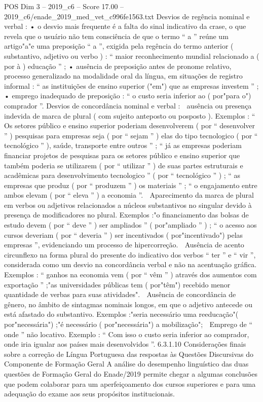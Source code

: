 \begin{textsample}{POS Dim 3 – 2019\_c6 – Score 17.00 – 2019\_c6/enade\_2019\_med\_vet\_c996fe1563.txt}
Desvios de regência nominal e verbal : • o desvio mais frequente é a falta do sinal indicativo da crase, o que revela que o usuário não tem consciência de que o termo “ a ” reúne um artigo"a"e uma preposição “ a ”, exigida pela regência do termo anterior ( substantivo, adjetivo ou verbo ) : “ maior reconhecimento mundial relacionado a ( por à ) educação ” ; • ausência de preposição antes de pronome relativo, processo generalizado na modalidade oral da língua, em situações de registro informal : “ as instituições de ensino superior ("em") que as empresas investem ” ; • emprego inadequado de preposição : “ o custo seria inferior ao ( por"para o") comprador ”.
Desvios de concordância nominal e verbal :  ausência ou presença indevida de marca de plural ( com sujeito anteposto ou posposto ).
Exemplos : “ Os setores público e ensino superior poderiam desenvolverem ( por “ desenvolver ” ) pesquisas para empresas seja ( por “ sejam ” ) elas do tipo tecnologico ( por “ tecnológico ” ), saúde, transporte entre outros ” ; “ já as empresas poderiam financiar projetos de pesquisas para os setores público e ensino superior que também poderia se utilizarem ( por “ utilizar ” ) de suas partes estruturais e acadêmicas para desenvolvimento tecnologico ” ( por “ tecnológico ” ) ; “ as empresas que produz ( por “ produzem ” ) os materiais ” ; “ o engajamento entre ambos elevam ( por “ eleva ” ) a economia ”.  Aparecimento da marca de plural em verbos ou adjetivos relacionados a núcleos substantivos no singular devido à presença de modificadores no plural.
Exemplos :"o financiamento das bolsas de estudo devem ( por “ deve ” ) ser ampliados ” ( por"ampliado ” ) ; “ o acesso aos cursos deveriam ( por “ deveria ” ) ser incentivados ( por"incentivado") pelas empresas ”, evidenciando um processo de hipercorreção.  Ausência de acento circunflexo na forma plural do presente do indicativo dos verbos “ ter ” e “ vir ”, considerada como um desvio na concordância verbal e não na acentuação gráfica.
Exemplos : “ ganhos na economia vem ( por “ vêm ” ) através dos aumentos com exportação ” ;"as universidades públicas tem ( por"têm") recebido menor quantidade de verbas para suas atividades".  Ausência de concordância de gênero, no âmbito de sintagmas nominais longos, em que o adjetivo antecede ou está afastado do substantivo.
Exemplos :"seria necessário uma reeducação"( por"necessária") ;"é necessário ( por"necessária") a mobilização";  Emprego de “ onde ” não locativo.
Exemplo : “ Com isso o custo seria inferior ao comprador, onde iria igualar aos países mais desenvolvidos ”. 6.3.1.10 Considerações finais sobre a correção de Língua Portuguesa das respostas às Questões Discursivas do Componente de Formação Geral A análise do desempenho linguístico das duas questões de Formação Geral do Enade/2019 permite chegar a algumas conclusões que podem colaborar para um aperfeiçoamento dos cursos superiores e para uma adequação do exame aos seus propósitos institucionais.

\end{textsample}
